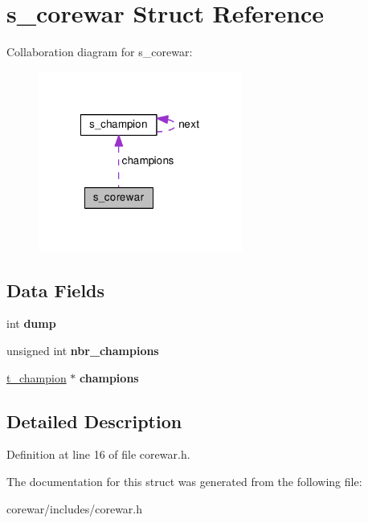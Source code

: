\hypertarget{structs__corewar}{\section{s\-\_\-corewar Struct Reference}
\label{structs__corewar}
}


Collaboration diagram for s\-\_\-corewar\-:
\nopagebreak
\begin{figure}[H]
\begin{center}
\leavevmode
\includegraphics[width=190pt]{structs__corewar__coll__graph}
\end{center}
\end{figure}
\subsection*{Data Fields}
\begin{DoxyCompactItemize}
\item 
\hypertarget{structs__corewar_a28773f3c282d16757e3a3e1027825a17}{int {\bfseries dump}}\label{structs__corewar_a28773f3c282d16757e3a3e1027825a17}

\item 
\hypertarget{structs__corewar_a5a44dad6cc6d5d67cb34464b4f25e171}{unsigned int {\bfseries nbr\-\_\-champions}}\label{structs__corewar_a5a44dad6cc6d5d67cb34464b4f25e171}

\item 
\hypertarget{structs__corewar_a2d2d5697f388905b044f2cde1f481d2d}{\hyperlink{structs__champion}{t\-\_\-champion} $\ast$ {\bfseries champions}}\label{structs__corewar_a2d2d5697f388905b044f2cde1f481d2d}

\end{DoxyCompactItemize}


\subsection{Detailed Description}


Definition at line 16 of file corewar.\-h.



The documentation for this struct was generated from the following file\-:\begin{DoxyCompactItemize}
\item 
corewar/includes/corewar.\-h\end{DoxyCompactItemize}
